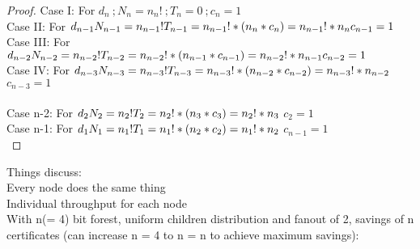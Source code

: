 \begin{proof}

	Case I: For $d_{n}\ ; N_{n} = n_{n}!\ ; T_{n} = 0\ ; c_{n} = 1 $\\
	Case II: For $d_{n - 1}\\ N_{n - 1} = n_{n - 1}!\\ T_{n - 1} = n_{n - 1}! * (n_{n} * c_{n}) = n_{n - 1}! * n_{n}\\ c_{n - 1} = 1\\ $
	Case III: For $d_{n - 2}\\ N_{n - 2} = n_{n - 2}!\\ T_{n -2} = n_{n - 2}! * (n_{n - 1} * c_{n - 1}) = n_{n - 2}! * n_{n - 1 } \\ c_{n - 2} = 1$\\
	Case IV: For $d_{n - 3}\\ N_{n - 3} = n_{n - 3}!\\ T_{n -3} = n_{n - 3}! * (n_{n - 2} * c_{n - 2}) = n_{n - 3}! * n_{n - 2 } \\$     $c_{n - 3} = 1$\\ \\
	Case n-2: For $d_{2}\\ N_{2} = n_{2}!\\ T_{2} = n_{2}! * (n_{3} * c_{3}) = n_{2}! * n_{3} \\$  $c_{2} = 1$\\
	Case n-1: For $d_{1}\\ N_{1} = n_{1}!\\ T_{1} = n_{1}! * (n_{2} * c_{2}) = n_{1}! * n_{2} \\$  $c_{n-1} = 1$\\

\end{proof}


Things discuss:\\
	Every node does the same thing\\
	Individual throughput for each node\\

With n(= 4) bit forest, uniform children distribution and fanout of 2, savings of n certificates (can increase n = 4 to n = n to achieve maximum savings):

